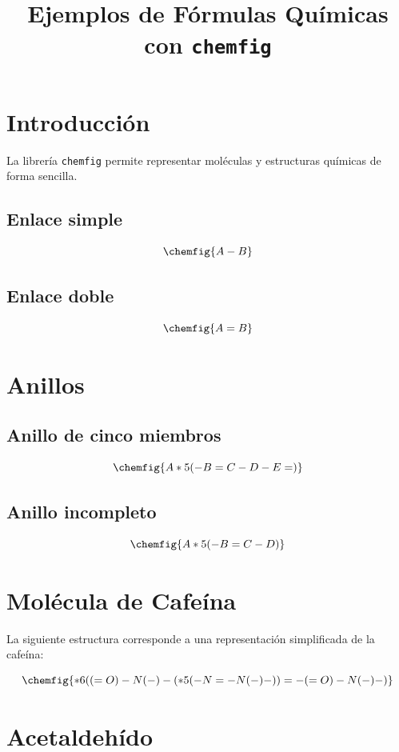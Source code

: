 \documentclass[12pt]{article}
\title{Ejemplos de Fórmulas Químicas con \texttt{chemfig}}
\author{}
\date{}
\begin{document}
\maketitle

\section{Introducción}

La librería \texttt{chemfig} permite representar moléculas y estructuras químicas de forma sencilla.

\subsection{Enlace simple}

\[
\chemfig{A-B}
\]

\subsection{Enlace doble}

\[
\chemfig{A=B}
\]

\section{Anillos}

\subsection{Anillo de cinco miembros}

\[
\chemfig{A*5(-B=C-D-E=)}
\]

\subsection{Anillo incompleto}

\[
\chemfig{A*5(-B=C-D)}
\]

\section{Molécula de Cafeína}

La siguiente estructura corresponde a una representación simplificada de la cafeína:

\[
\chemfig{*6((=O)-N(-)-(*5(-N=-N(-)-))=-(=O)-N(-)-)}
\]

\section{Acetaldehído}
\end{document}
